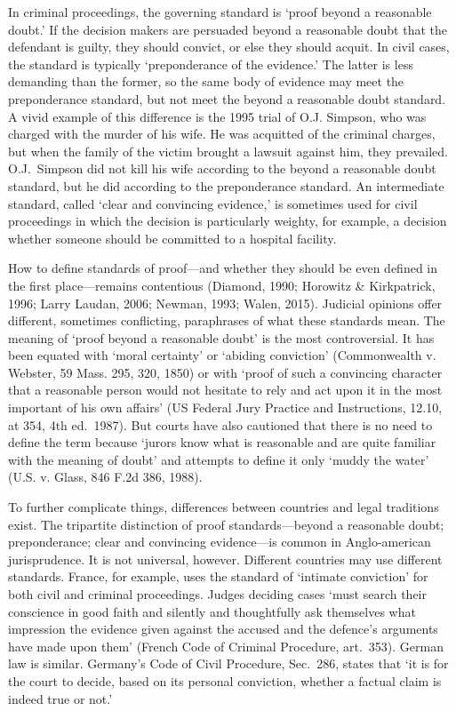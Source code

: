 \documentclass[
  10pt,
  dvipsnames,enabledeprecatedfontcommands]{scrartcl}
\begin{document}
In criminal proceedings, the governing standard is `proof beyond a
reasonable doubt.' If the decision makers are persuaded beyond a
reasonable doubt that the defendant is guilty, they should convict, or
else they should acquit. In civil cases, the standard is typically
`preponderance of the evidence.' The latter is less demanding than the
former, so the same body of evidence may meet the preponderance
standard, but not meet the beyond a reasonable doubt standard. A vivid
example of this difference is the 1995 trial of O.J. Simpson, who was
charged with the murder of his wife. He was acquitted of the criminal
charges, but when the family of the victim brought a lawsuit against
him, they prevailed. O.J.~Simpson did not kill his wife according to the
beyond a reasonable doubt standard, but he did according to the
preponderance standard. An intermediate standard, called `clear and
convincing evidence,' is sometimes used for civil proceedings in which
the decision is particularly weighty, for example, a decision whether
someone should be committed to a hospital facility.

How to define standards of proof---and whether they should be even
defined in the first place---remains contentious (Diamond, 1990;
Horowitz \& Kirkpatrick, 1996; Larry Laudan, 2006; Newman, 1993; Walen,
2015). Judicial opinions offer different, sometimes conflicting,
paraphrases of what these standards mean. The meaning of `proof beyond a
reasonable doubt' is the most controversial. It has been equated with
`moral certainty' or `abiding conviction' (Commonwealth v. Webster, 59
Mass. 295, 320, 1850) or with `proof of such a convincing character that
a reasonable person would not hesitate to rely and act upon it in the
most important of his own affairs' (US Federal Jury Practice and
Instructions, 12.10, at 354, 4th ed.~1987). But courts have also
cautioned that there is no need to define the term because `jurors know
what is reasonable and are quite familiar with the meaning of doubt' and
attempts to define it only `muddy the water' (U.S. v. Glass, 846 F.2d
386, 1988).

To further complicate things, differences between countries and legal
traditions exist. The tripartite distinction of proof standards---beyond
a reasonable doubt; preponderance; clear and convincing evidence---is
common in Anglo-american jurisprudence. It is not universal, however.
Different countries may use different standards. France, for example,
uses the standard of `intimate conviction' for both civil and criminal
proceedings. Judges deciding cases `must search their conscience in good
faith and silently and thoughtfully ask themselves what impression the
evidence given against the accused and the defence's arguments have made
upon them' (French Code of Criminal Procedure, art.~353). German law is
similar. Germany's Code of Civil Procedure, Sec.~286, states that `it is
for the court to decide, based on its personal conviction, whether a
factual claim is indeed true or
not.'
\end{document}
